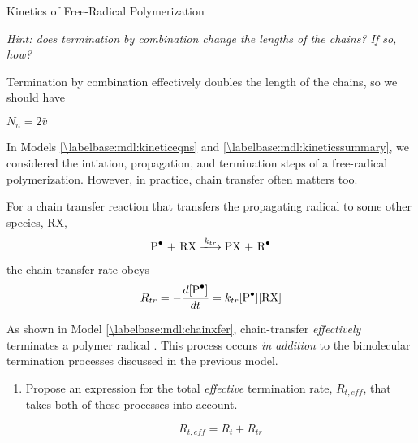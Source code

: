 \begin{activity}{Kinetics of Free-Radical Polymerization}
\begin{ctqs}
\begin{enumerate}
				\emph{Hint: does termination by combination change the lengths of the chains?  If so, how?}
				
				\begin{solution}[0.75in]{}
					Termination by combination effectively doubles the length of the chains, so we should have 
					
					$N_n = 2\bar v$
				\end{solution}
		
		\end{enumerate}

\end{ctqs}

		
\clearpage
\begin{model}
\label{\labelbase:mdl:chainxfer}

	In Models \ref{\labelbase:mdl:kineticeqns} and \ref{\labelbase:mdl:kineticssummary}, we considered the intiation, propagation, and termination steps of a free-radical polymerization.  However, in practice, chain transfer often matters too.
	
	For a chain transfer reaction that transfers the propagating radical to some other species, RX,
	\begin{align*}
		\text{\ce{P^.} + RX} \xlongrightarrow{k_{tr}} \text{PX + \ce{R^.}}
	\end{align*}
	the chain-transfer rate obeys
	\begin{align*}
		R_{tr} = -\frac{d[\text{\ce{P^.}}]}{dt} = k_{tr}\text{[\ce{P^.}][RX]}
	\end{align*}
	
\end{model}

\begin{ctqs}
	\question As shown in Model \ref{\labelbase:mdl:chainxfer}, chain-transfer \emph{effectively} terminates a polymer radical .  This process occurs \emph{in addition} to the bimolecular termination processes discussed in the previous model.
	
		\begin{enumerate}
			\item Propose an expression for the total \emph{effective} termination rate, $R_{t,eff}$, that takes both of these processes into account.
		
		\begin{solution}[0.5in]{}
	
			\begin{equation*}
				R_{t,eff} = R_t + R_{tr}
			\end{equation*}
	

\end{solution}
\end{enumerate}
\end{ctqs}
\end{activity}
